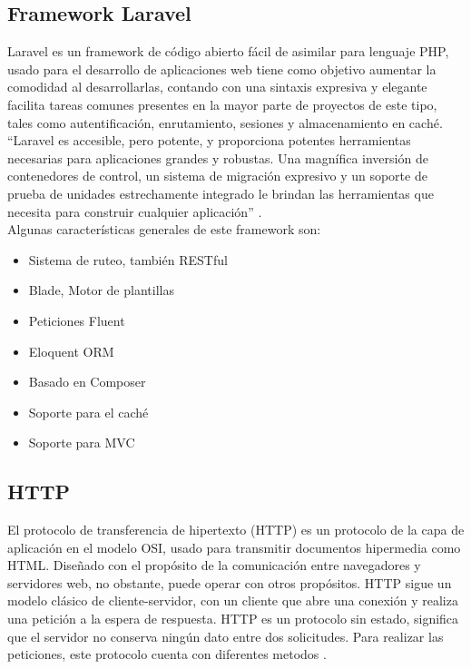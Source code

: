 \subsection{Framework Laravel}

Laravel es un framework de código abierto fácil de asimilar para lenguaje PHP, usado para el desarrollo de aplicaciones web tiene como objetivo aumentar la comodidad al desarrollarlas, contando con una sintaxis expresiva y elegante facilita tareas comunes presentes en la mayor parte de proyectos de este tipo, tales como autentificación, enrutamiento, sesiones y almacenamiento en caché. \\

“Laravel es accesible, pero potente, y proporciona potentes herramientas necesarias para aplicaciones grandes y robustas. Una magnífica inversión de contenedores de control, un sistema de migración expresivo y un soporte de prueba de unidades estrechamente integrado le brindan las herramientas que necesita para construir cualquier aplicación'' \cite{Lara}.\\

Algunas características generales de este framework son:\\

\begin{itemize}
	\item Sistema de ruteo, también RESTful
	\item Blade, Motor de plantillas
	\item Peticiones Fluent
	\item Eloquent ORM
	\item Basado en Composer
	\item Soporte para el caché
	\item Soporte para MVC
\end{itemize}

\subsection{HTTP}

El protocolo de transferencia de hipertexto (HTTP) es un protocolo de la capa de aplicación en el modelo OSI, usado para transmitir documentos hipermedia como HTML. Diseñado con el propósito de la comunicación entre navegadores y servidores web, no obstante, puede operar con otros propósitos. HTTP sigue un modelo clásico de cliente-servidor, con un cliente que abre una conexión y realiza una petición a la espera de respuesta. HTTP es un protocolo sin estado, significa que el servidor no conserva ningún dato entre dos solicitudes. Para realizar las peticiones, este protocolo cuenta con diferentes metodos \cite{HTTP}.

